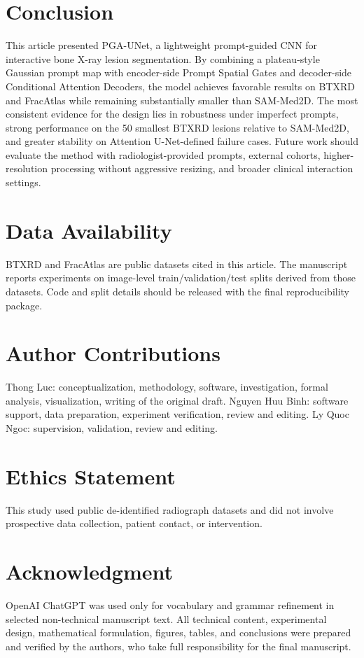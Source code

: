 \documentclass{ieeeaccess}
\begin{document}
\section{Conclusion}
This article presented PGA-UNet, a lightweight prompt-guided CNN for interactive bone X-ray lesion segmentation. By combining a plateau-style Gaussian prompt map with encoder-side Prompt Spatial Gates and decoder-side Conditional Attention Decoders, the model achieves favorable results on BTXRD and FracAtlas while remaining substantially smaller than SAM-Med2D. The most consistent evidence for the design lies in robustness under imperfect prompts, strong performance on the 50 smallest BTXRD lesions relative to SAM-Med2D, and greater stability on Attention U-Net-defined failure cases. Future work should evaluate the method with radiologist-provided prompts, external cohorts, higher-resolution processing without aggressive resizing, and broader clinical interaction settings.

\section*{Data Availability}
BTXRD and FracAtlas are public datasets cited in this article. The manuscript reports experiments on image-level train/validation/test splits derived from those datasets. Code and split details should be released with the final reproducibility package.

\section*{Author Contributions}
Thong Luc: conceptualization, methodology, software, investigation, formal analysis, visualization, writing of the original draft. Nguyen Huu Binh: software support, data preparation, experiment verification, review and editing. Ly Quoc Ngoc: supervision, validation, review and editing.

\section*{Ethics Statement}
This study used public de-identified radiograph datasets and did not involve prospective data collection, patient contact, or intervention.

\section*{Acknowledgment}
OpenAI ChatGPT was used only for vocabulary and grammar refinement in selected non-technical manuscript text. All technical content, experimental design, mathematical formulation, figures, tables, and conclusions were prepared and verified by the authors, who take full responsibility for the final manuscript.
\end{document}
